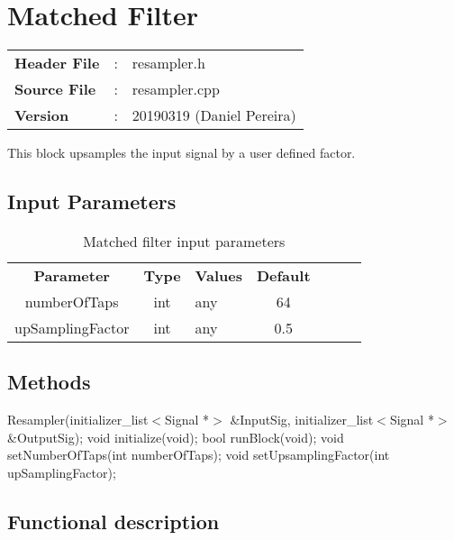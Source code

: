 \clearpage

\section{Matched Filter}

\begin{tcolorbox}	
	\begin{tabular}{p{2.75cm} p{0.2cm} p{10.5cm}} 	
		\textbf{Header File}   &:& resampler.h \\
		\textbf{Source File}   &:& resampler.cpp \\
        \textbf{Version}       &:& 20190319 (Daniel Pereira)\\
	\end{tabular}
\end{tcolorbox}

This block upsamples the input signal by a user defined factor.

\subsection*{Input Parameters}

\begin{table}[h]
	\centering
	\begin{tabular}{|c|c|p{60mm}|c|ccc}
		\cline{1-4}
		\textbf{Parameter} & \textbf{Type}   & \textbf{Values} & \textbf{Default} \\ \cline{1-4}
		numberOfTaps       & int             & any             & 64               \\ \cline{1-4}
		upSamplingFactor   & int          & any             & 0.5              \\ \cline{1-4}
	\end{tabular}
	\caption{Matched filter input parameters} 
	\label{table:MatchedFilter_in_par}
\end{table}

\subsection*{Methods}

\bigbreak
Resampler(initializer\_list$<$Signal *$>$ \&InputSig, initializer\_list$<$Signal *$>$ \&OutputSig);
\bigbreak
void initialize(void);
\bigbreak
bool runBlock(void);
\bigbreak
void setNumberOfTaps(int numberOfTaps);
\bigbreak
void setUpsamplingFactor(int upSamplingFactor);

\subsection*{Functional description}


